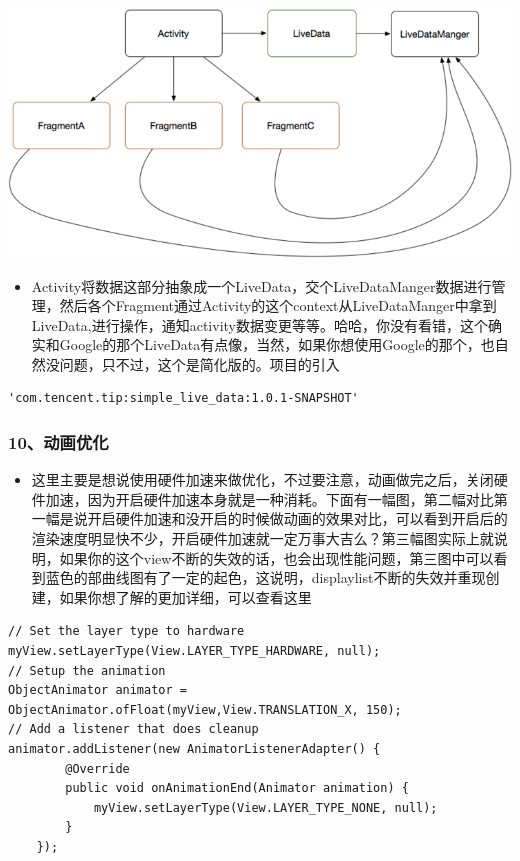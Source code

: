 \documentclass[9pt, b5paper]{article}
\begin{document}
\includegraphics[width=.9\linewidth]{./pic/fragData.png}

\begin{itemize}
\item Activity将数据这部分抽象成一个LiveData，交个LiveDataManger数据进行管理，然后各个Fragment通过Activity的这个context从LiveDataManger中拿到LiveData,进行操作，通知activity数据变更等等。哈哈，你没有看错，这个确实和Google的那个LiveData有点像，当然，如果你想使用Google的那个，也自然没问题，只不过，这个是简化版的。项目的引入
\end{itemize}
\begin{verbatim}
'com.tencent.tip:simple_live_data:1.0.1-SNAPSHOT'
\end{verbatim}
\subsubsection{10、动画优化}
\label{sec-1-8-10}
\begin{itemize}
\item 这里主要是想说使用硬件加速来做优化，不过要注意，动画做完之后，关闭硬件加速，因为开启硬件加速本身就是一种消耗。下面有一幅图，第二幅对比第一幅是说开启硬件加速和没开启的时候做动画的效果对比，可以看到开启后的渲染速度明显快不少，开启硬件加速就一定万事大吉么？第三幅图实际上就说明，如果你的这个view不断的失效的话，也会出现性能问题，第三图中可以看到蓝色的部曲线图有了一定的起色，这说明，displaylist不断的失效并重现创建，如果你想了解的更加详细，可以查看这里
\end{itemize}
\begin{verbatim}
// Set the layer type to hardware
myView.setLayerType(View.LAYER_TYPE_HARDWARE, null);
// Setup the animation
ObjectAnimator animator = ObjectAnimator.ofFloat(myView,View.TRANSLATION_X, 150);
// Add a listener that does cleanup
animator.addListener(new AnimatorListenerAdapter() {
        @Override
        public void onAnimationEnd(Animator animation) {
            myView.setLayerType(View.LAYER_TYPE_NONE, null);
        }
    });
\end{verbatim}
\end{document}
